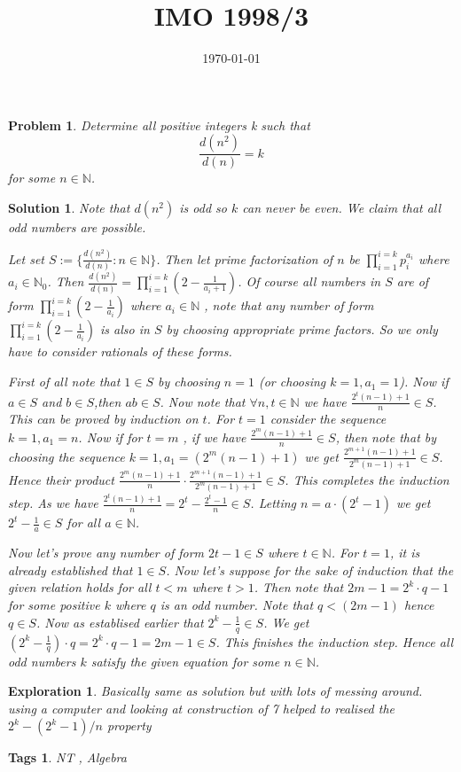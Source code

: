\documentclass{article}
\title{IMO 1998/3}
\date{\today}
\newtheorem*{problem}{Problem}
\newtheorem*{solution}{Solution}
\newtheorem*{exploration}{Exploration}
\newtheorem*{tags}{Tags}
\begin{document}
	
	\maketitle
	
	\begin{problem}
		Determine all positive integers k such that
		\[
		\frac{d(n^2)}{d(n)}= k
		\]
		for some $n \in \mathbb{N}$.
	\end{problem}
	
	\begin{solution}
		Note that $d(n^2)$ is odd so $k$ can never be even. We claim that all odd numbers are possible.
		
		Let set $S := \{\frac{d(n^2)}{d(n)} : n \in \mathbb{N}\}$. Then let prime factorization of $n$  be 
		$\prod_{i=1}^{i=k} p_i^{a_i}$ where $a_i \in \mathbb{N}_0$. Then $\frac{d(n^2)}{d(n)}=\prod_{i=1}^{i=k} (2-\frac{1}{a_i+1})$. Of course all numbers in $S$ are of form   
		$\prod_{i=1}^{i=k} (2-\frac{1}{a_i})$ where $a_i  \in \mathbb{N}$ , note that any number of form $\prod_{i=1}^{i=k} (2-\frac{1}{a_i})$ is also in $S$ by choosing appropriate prime factors. So we only have to consider rationals of these forms.
		
		First of all note that $1 \in S$ by choosing $n=1$ (or choosing $k=1 , a_1 = 1$). Now if $a \in S$ and $b \in S$,then $ab \in S$. Now note that $\forall n ,t \in \mathbb{N}$ we have $\frac{2^t(n-1)+1}{n} \in S$. This can be proved by induction on $t$. For $t=1$ consider the sequence $k=1,a_1=n$. Now if for $t=m$ , if we have  $\frac{2^m(n-1)+1}{n} \in S$, then note that by choosing the sequence 
		$k=1, a_1 = (2^m (n-1)+1)$ we get $\frac{2^{m+1}(n-1)+1}{2^m (n-1)+1} \in S$. Hence their product $\frac{2^m(n-1)+1}{n} \cdot \frac{2^{m+1}(n-1)+1}{2^m (n-1)+1} \in S$. This completes the induction step. As we have $\frac{2^t(n-1)+1}{n} = 2^t - \frac{2^t-1}{n} \in S$. Letting 
		$n= a \cdot (2^t-1)$ we get $2^t - \frac{1}{a} \in S$ for all $a \in \mathbb{N}$.
		
		Now let's prove any number of form $2t-1 \in S$ where $t \in \mathbb{N}$. For $t=1$, it is already established that $1 \in S$. Now let's suppose for the sake of induction that the given relation holds for all $t<m$ where $t>1$. Then note that $2m-1=2^k \cdot q - 1$ for some  positive $k$ where $q$ is an odd number. Note that $q< (2m-1)$ hence $q \in S$. Now as establised earlier that $2^k - \frac{1}{q} \in S$. We get 
		$(2^k - \frac{1}{q} )\cdot q = 2^k \cdot q - 1 = 2m-1 \in S$. This finishes the induction step. 
		Hence all odd numbers $k$ satisfy the given equation for some $n \in \mathbb{N}$.
	\end{solution}
	
	\begin{exploration}
		Basically same as solution but with lots of messing around. using a computer and looking at construction of 7 helped to realised the $2^k - (2^k - 1)/n$ property
	\end{exploration}
	
	\begin{tags}
		NT , Algebra 
	\end{tags}
	
\end{document}
